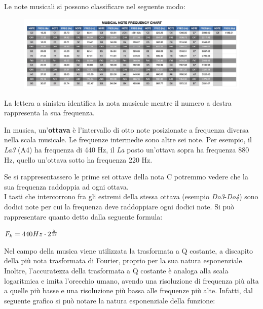 Le note musicali si possono classificare nel seguente modo:
\begin{figure}[H]
	\centering
	\includegraphics[scale=0.15]{./images/img4.jpg}
\end{figure}
La lettera a sinistra identifica la nota musicale mentre il numero a destra rappresenta la sua frequenza.

In musica, un'\textbf{ottava} è l'intervallo di otto note posizionate a frequenza diversa nella scala musicale. Le frequenze intermedie sono altre sei note. Per esempio, il \textit{La3} (A4) ha frequenza di 440 Hz, il \textit{La} posto un'ottava sopra ha frequenza 880 Hz, quello un'ottava sotto ha frequenza 220 Hz.

Se si rappresentassero le prime sei ottave della nota C potremmo vedere che la sua frequenza raddoppia ad ogni ottava. \\
\newline
I tasti che intercorrono fra gli estremi della stessa ottava (esempio \textit{Do3}-\textit{Do4}) sono dodici note per cui la frequenza deve raddoppiare ogni dodici note. Si può rappresentare quanto detto dalla seguente formula: \\

\begin{center}
	\begin{math}
		F_{k}=440Hz \cdot 2^{k \over 12}
	\end{math}
\end{center}
Nel campo della musica viene utilizzata la trasformata a Q costante, a discapito della più nota trasformata di Fourier, proprio per la sua natura esponenziale. Inoltre, l'accuratezza della trasformata a Q costante è analoga alla scala logaritmica e imita l'orecchio umano, avendo una risoluzione di frequenza più alta a quelle più basse e una risoluzione più bassa alle frequenze più alte. Infatti, dal seguente grafico si può notare la natura esponenziale della funzione:
\begin{center}
\end{center}